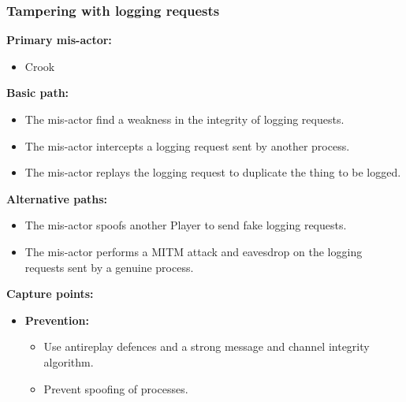 \documentclass[a4paper,11pt]{report}
\begin{document}
\subsubsection{Tampering with logging requests}
\textbf{Primary mis-actor:}
\begin{itemize}
\item Crook
\end{itemize}
\textbf{Basic path:}
\begin{itemize}
\item The mis-actor find a weakness in the integrity of logging requests.
\item The mis-actor intercepts a logging request sent by another process.
\item The mis-actor replays the logging request to duplicate the thing to be logged.
\end{itemize}
\textbf{Alternative paths:}
\begin{itemize}
\item The mis-actor spoofs another Player to send fake logging requests.
\item The mis-actor performs a MITM attack and eavesdrop on the logging requests sent by a genuine process.
\end{itemize}
\textbf{Capture points:}
\begin{itemize}
\item \textbf{Prevention:}
\begin{itemize}
\item Use antireplay defences and a strong message and channel integrity algorithm.
\item Prevent spoofing of processes.
\end{itemize}
\end{itemize}
\end{document}
